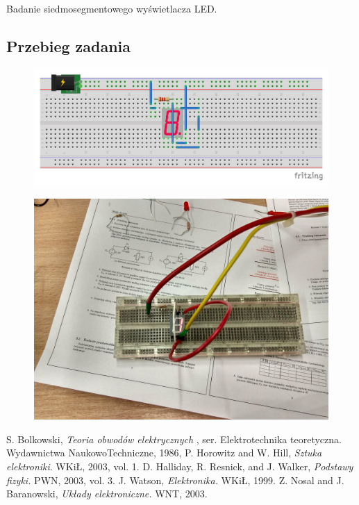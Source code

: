 \documentclass[polish,polish,a4paper]{article}
\begin{document}
Badanie siedmosegmentowego wyświetlacza LED.

\subsection{Przebieg zadania}


\begin{figure}[H]
	\centering
	\includegraphics[scale=0.8]{nwm_bb.pdf}
\end{figure}

\begin{figure}[H]
	\centering
	\includegraphics[scale=0.2]{display.jpg}
\end{figure}


	\begin{thebibliography}{99}
		S. Bolkowski,  \emph{Teoria obwodów elektrycznych} , ser. Elektrotechnika teoretyczna. Wydawnictwa NaukowoTechniczne,
		1986, 
		P. Horowitz and W. Hill, \emph{Sztuka elektroniki}. WKiŁ, 2003, vol. 1.
		D. Halliday, R. Resnick, and J. Walker, \emph{Podstawy fizyki.} PWN, 2003, vol. 3.
		J. Watson,\emph{ Elektronika.} WKiŁ, 1999.
		Z. Nosal and J. Baranowski, \emph{Układy elektroniczne.} WNT, 2003.
	\end{thebibliography}
	\newpage
	\tableofcontents
		
\end{document}
